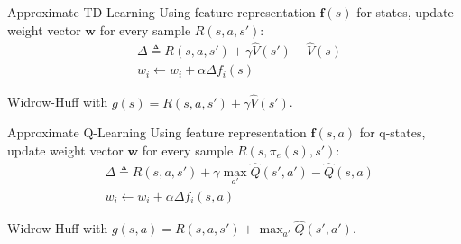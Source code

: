 \documentclass{cognito}
\begin{document}
\begin{note}{Approximate TD Learning}
	Using feature representation $\mathbf{f}(s)$ for states, update weight vector $\mathbf{w}$
	for every sample $R(s, a, s')$:
	\begin{align*}
		&\textstyle \Delta \triangleq R(s, a, s') + \gamma \hat{V}(s') - \hat{V}(s)\\
		&\textstyle w_i \leftarrow w_i + \alpha \Delta f_i(s)
	\end{align*}%
	\begin{remark} Widrow-Huff with $g(s) = R(s, a, s') + \gamma \hat{V}(s')$.\end{remark}
	\vspace{-5pt}
\end{note}


\begin{note}{Approximate Q-Learning}
	Using feature representation $\mathbf{f}(s,a)$ for q-states, update weight vector $\mathbf{w}$
	for every sample $R(s, \pi_e(s), s')$:
	\begin{align*}
		&\textstyle \Delta \triangleq R(s, a, s') + \gamma \max_{a'} \hat{Q}(s',a') - \hat{Q}(s, a)\\
		&\textstyle w_i \leftarrow w_i + \alpha \Delta f_i(s, a)
	\end{align*}%
	\begin{remark} Widrow-Huff with $g(s,a) = R(s, a, s') + \max_{a'} \hat{Q}(s',a') $.\end{remark}
	\vspace{-5pt}
\end{note}


\end{document}
